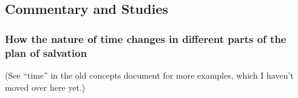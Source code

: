 	
	
	
\subsection{Commentary and Studies} %
	\label{TIME-COMMENTARY}

	
		
	\subsubsection{How the nature of time changes in different parts of the plan of salvation}
		\label{TIME-nature}
		
		(See ``time'' in the old concepts document for more examples, which I haven't moved over here yet.)
		
